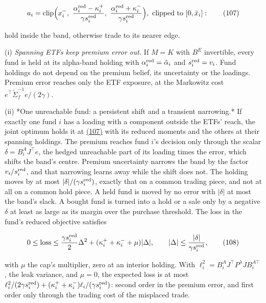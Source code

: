 \documentclass[11pt]{article}
\begin{document}
\begin{equation*}
a_i=\mathrm{clip}\Bigl(x^-_i,\ \frac{\alpha^{\rm red}_i-\kappa^+_i}{\gamma s^{\rm red}_i},\
 \frac{\alpha^{\rm red}_i+\kappa^-_i}{\gamma s^{\rm red}_i}\Bigr),\ \text{clipped to }[0,\bar x_i]:\tag{107}\label{eq:107}
\end{equation*}

hold inside the band, otherwise trade to its nearer edge.

(i) \emph{Spanning ETFs keep premium error out.} If \(M=K\) with \(B^E\)
invertible, every fund is held at its alpha-band holding with
\(\alpha^{\rm red}_i=\hat\alpha_i\) and \(s^{\rm red}_i=v_i\). Fund holdings do not depend on
the premium belief, its uncertainty or the loadings. Premium error
reaches only the ETF exposure, at the Markowitz cost
\(e^\top\tilde\Sigma_f^{-1}e/(2\gamma)\).

(ii) *One unreachable fund: a persistent shift and a transient
narrowing.* If exactly one fund \(i\) has a loading with a component
outside the ETFs' reach, the joint optimum holds it at \hyperref[eq:107]{(107)} with its
reduced moments and the others at their spanning holdings. The premium
reaches fund \(i\)'s decision only through the scalar \(\delta=B^A_iJ^\top e\), the
hedged unreachable part of its loading times the error, which shifts
the band's centre. Premium uncertainty narrows the band by the factor
\(v_i/s^{\rm red}_i\), and that narrowing learns away while the shift does not.
The holding moves by at most \(|\delta|/(\gamma s^{\rm red}_i)\), exactly that on a
common trading piece, and not at all on a common hold piece. A held
fund is moved by no error with \(|\delta|\) at most the band's slack. A bought
fund is turned into a hold or a sale only by a negative \(\delta\) at least as
large as its margin over the purchase threshold. The loss in the
fund's reduced objective satisfies

\begin{equation*}
0\leq\mathrm{loss}\leq\frac{\gamma s^{\rm red}_i}2\Delta^2+(\kappa^+_i+\kappa^-_i+\mu)|\Delta|,
\qquad|\Delta|\leq\frac{|\delta|}{\gamma s^{\rm red}_i},\tag{108}\label{eq:108}
\end{equation*}

with \(\mu\) the cap's multiplier, zero at an interior holding. With
\(\ell_i^2=B^A_iJ^\top P^\lambda JB^{A\top}_i\), the leak variance, and \(\mu=0\), the expected
loss is at most \(\ell_i^2/(2\gamma s^{\rm red}_i)+(\kappa^+_i+\kappa^-_i)\ell_i/(\gamma s^{\rm red}_i)\):
second order in the premium error, and first order only through the
trading cost of the misplaced trade.
\end{document}
